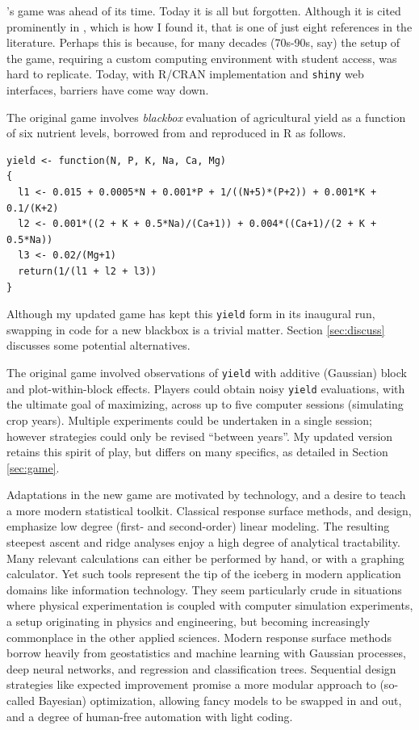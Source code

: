 \documentclass[12pt]{article}
\begin{document}
\citeauthor{mead:freeman:1973}'s game was ahead of its time.  Today it is all
but forgotten. Although it is cited prominently in  \cite{box:draper:1987},
which is how I found it, that is one of just eight references in the
literature. Perhaps this is because, for many decades (70s-90s, say) the setup
of the game, requiring a custom computing environment with student access, was
hard to replicate.  Today, with {\sf R}/CRAN \citep{cranR} implementation and
{\tt shiny} \citep{shiny} web interfaces, barriers have come way down.
  
The original game involves {\em blackbox} evaluation of agricultural yield
as a function of six nutrient levels, borrowed from \cite{nelder:1966} and
reproduced in {\sf R} as follows.

{\singlespacing
\begin{verbatim}
yield <- function(N, P, K, Na, Ca, Mg)
{
  l1 <- 0.015 + 0.0005*N + 0.001*P + 1/((N+5)*(P+2)) + 0.001*K + 0.1/(K+2)
  l2 <- 0.001*((2 + K + 0.5*Na)/(Ca+1)) + 0.004*((Ca+1)/(2 + K + 0.5*Na))
  l3 <- 0.02/(Mg+1)
  return(1/(l1 + l2 + l3))
}
\end{verbatim}}

\noindent Although my updated game has kept this {\tt yield} form in its
inaugural run, swapping in code for a new blackbox is a trivial matter. Section
\ref{sec:discuss} discusses some potential alternatives.

The original game involved observations of {\tt yield} with additive
(Gaussian) block and plot-within-block effects.  Players could obtain noisy
{\tt yield} evaluations, with the ultimate goal of maximizing, across up to
five computer sessions (simulating crop years).  Multiple experiments could be
undertaken in a single session; however strategies could only be revised
``between years''. My updated version retains this spirit of play, but differs
on many specifics, as detailed in Section \ref{sec:game}.

Adaptations in the new game are motivated by technology, and a desire to teach
a more modern statistical toolkit.  Classical response surface methods, and
design, emphasize low degree (first- and second-order) linear modeling.  The
resulting steepest ascent and ridge analyses \citep[see,
e.g.,][]{box:draper:1987,myers:etal:2016} enjoy a high degree of analytical
tractability. Many relevant calculations can either be performed by hand, or
with a graphing calculator.  Yet such tools represent the tip of the iceberg
in modern application domains like information technology. They seem
particularly crude in situations where physical experimentation is coupled
with computer simulation experiments, a setup originating in physics and
engineering, but becoming increasingly commonplace in the other applied sciences.
Modern response surface methods borrow heavily from geostatistics and machine
learning with Gaussian processes, deep neural networks, and regression and
classification trees.  Sequential design strategies like expected improvement
\citep{jones:schonlau:welch:1998} promise a more modular approach to
(so-called Bayesian) optimization, allowing fancy models to be swapped in and out,
and a degree of human-free automation with light coding.
\end{document}
